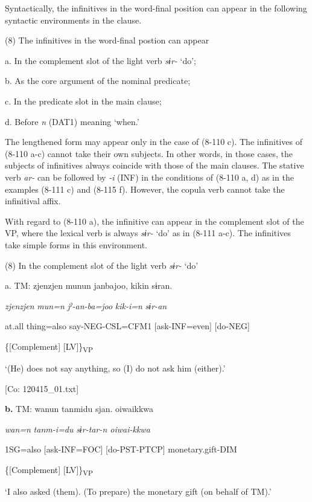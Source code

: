   Syntactically, the infinitives in the word-final position can appear in the following syntactic environments in the clause.

(8)  The infinitives in the word-final postion can appear

  a. In the complement slot of the light verb \textit{sɨr-} ‘do’;

  b. As the core argument of the nominal predicate;

  c. In the predicate slot in the main clause;

  d. Before \textit{n} (DAT1) meaning ‘when.’

The lengthened form may appear only in the case of (8-110 c). The infinitives of (8-110 a-c) cannot take their own subjects. In other words, in those cases, the subjects of infinitives always coincide with those of the main clauses. The stative verb \textit{ar-} can be followed by \textit{{}-i} (INF) in the conditions of (8-110 a, d) as in the examples (8-111 c) and (8-115 f). However, the copula verb cannot take the infinitival affix.

With regard to (8-110 a), the infinitive can appear in the complement slot of the VP, where the lexical verb is always \textit{sɨr-} ‘do’ as in (8-111 a-c). The infinitives take simple forms in this environment.

(8)  In the complement slot of the light verb \textit{sɨr-} ‘do’

  a.  TM:  zjenzjen  munun  janbajoo,  kikin  sɨran.

      \textit{zjenzjen}  \textit{mun=n}  \textit{jˀ-an-ba=joo}  \textit{kik-i=n}  \textit{sɨr{}-an}

      at.all  thing=also  say-NEG-CSL=CFM1  [ask-INF=even]  [do-NEG]

            \{[Complement]  [LV]\}\textsubscript{VP}

      ‘(He) does not say anything, so (I) do not ask him (either).’

      [Co: 120415\_01.txt]

  \textbf{b.}  TM:  wanun  tanmidu  sjan.  {\textbar}oiwai{\textbar}kkwa

      \textit{wan=n}  \textit{tanm-i=du}  \textit{sɨr{}-tar-n  oiwai-kkwa}

      1SG=also  [ask-INF=FOC]  [do-PST-PTCP]  monetary.gift-DIM

        \{[Complement]  [LV]\}\textsubscript{VP}  

      ‘I also asked (them). (To prepare) the monetary gift (on behalf of TM).’

